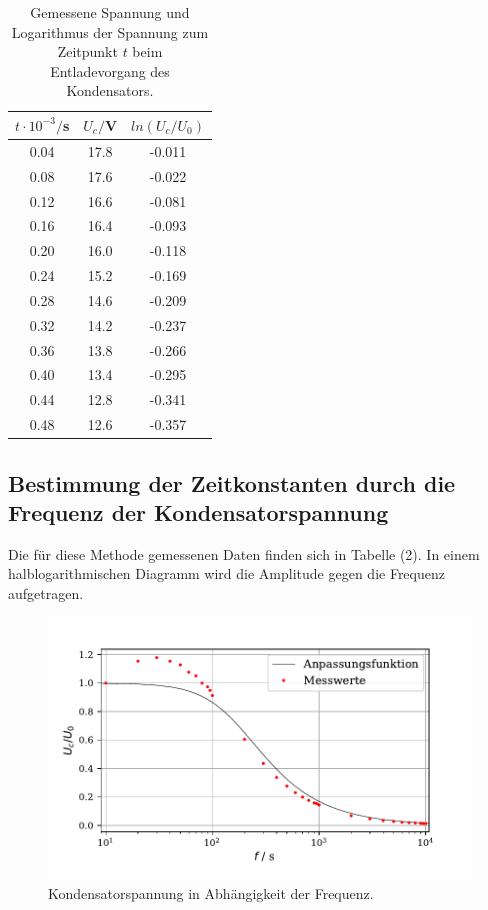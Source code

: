 \begin{table}[H]
  \centering
  \caption{Gemessene Spannung und Logarithmus der Spannung zum Zeitpunkt $t$ beim Entladevorgang des Kondensators. }
  \label{tab:Parameter}
  \begin{tabular}{c c c}
    \toprule
    $t\cdot 10^{-3}/$s & $U_c/$V & $ln(U_c/U_0)$  \\
    \bottomrule
     0.04 & 17.8  & -0.011 \\
     0.08 & 17.6  & -0.022\\
     0.12& 16.6  & -0.081\\
     0.16& 16.4  & -0.093\\
     0.20 & 16.0  &-0.118\\
     0.24 & 15.2  &-0.169\\
     0.28 & 14.6  &-0.209\\
     0.32& 14.2 & -0.237\\
     0.36& 13.8  & -0.266\\
     0.40& 13.4  & -0.295\\
     0.44& 12.8  & -0.341\\
     0.48& 12.6  & -0.357\\
     
    \bottomrule
  \end{tabular}
\end{table}

\subsection{Bestimmung der Zeitkonstanten durch die Frequenz der Kondensatorspannung}
Die für diese Methode gemessenen Daten finden sich in Tabelle (2). 
In einem halblogarithmischen Diagramm wird die Amplitude gegen die Frequenz aufgetragen.

\begin{figure}[H]
  \centering
  \includegraphics{plot2.pdf}
  \caption{Kondensatorspannung in Abhängigkeit der Frequenz.}
  \label{fig:plot}
\end{figure}

